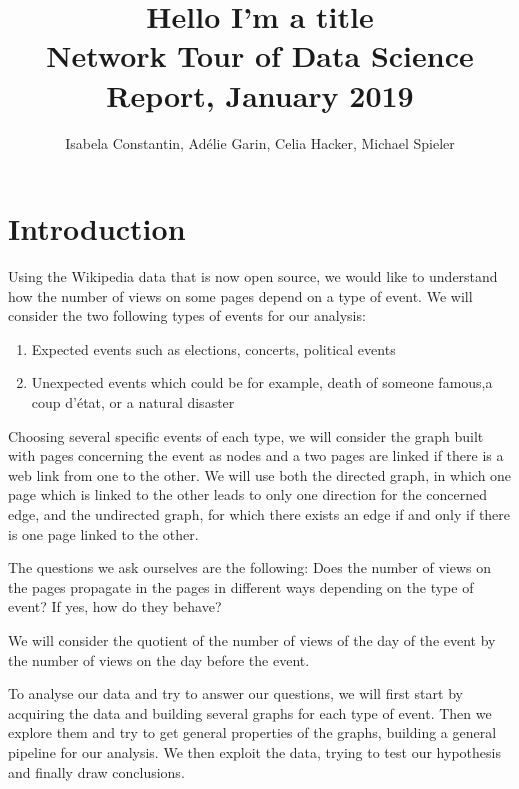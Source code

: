 \documentclass[conference]{IEEEtran}
\begin{document}
\title{Hello I'm a title\\
{\footnotesize Network Tour of Data Science Report, January 2019}
}

\author{Isabela Constantin, Ad\'elie Garin, Celia Hacker, Michael Spieler}

\maketitle

\section{Introduction}
Using the Wikipedia data that is now open source, we would like to understand how the number of views on some pages depend on a type of event. We will consider the two following types of events for our analysis:
\begin{enumerate}
\item Expected events such as elections, concerts, political events
\item Unexpected events which could be for example, death of someone famous,a coup d’état, or a natural disaster
\end{enumerate} 



Choosing several specific events of each type, we will consider the graph built with pages concerning the event as nodes and a two pages are linked if there is a web link from one to the other. We will use both the directed graph, in which one page which is linked to the other leads to only one direction for the concerned edge, and the undirected graph, for which there exists an edge if and only if there is one page linked to the other. 
\medskip

The questions we ask ourselves are the following:  Does the number of views on the pages propagate in the pages in different ways depending on the type of event? If yes, how do they behave?
\medskip

We will consider the quotient of the number of views of the day of the event by the number of views on the day before the event. 
\medskip

To analyse our data and try to answer our questions, we will first start by acquiring the data and building several graphs for each type of event.  Then we explore them and try to get general properties of the graphs, building a general pipeline for our analysis. We then exploit the data, trying to test our hypothesis and finally draw conclusions. 
\end{document}
